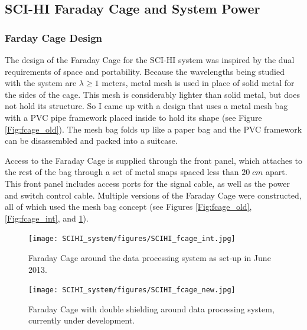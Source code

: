 \subsection{SCI-HI Faraday Cage and System Power}

\subsubsection{Farday Cage Design}

The design of the Faraday Cage for the SCI-HI system was inspired by the dual requirements of space and portability. Because the wavelengths being studied with the system are $\lambda \geq 1$ meters, metal mesh is used in place of solid metal for the sides of the cage. This mesh is considerably lighter than solid metal, but does not hold its structure. So I came up with a design that uses a metal mesh bag with a PVC pipe framework placed inside to hold its shape (see Figure \ref{Fig:fcage_old}). The mesh bag folds up like a paper bag and the PVC framework can be disassembled and packed into a suitcase. 

Access to the Faraday Cage is supplied through the front panel, which attaches to the rest of the bag through a set of metal snaps spaced less than $20 \; cm$ apart. This front panel includes access ports for the signal cable, as well as the power and switch control cable. Multiple versions of the Faraday Cage were constructed, all of which used the mesh bag concept (see Figures \ref{Fig:fcage_old}, \ref{Fig:fcage_int}, and \ref{Fig:fcage_new}). 

\begin{figure}[htb]
\centering
\begin{minipage}[b]{0.46\textwidth}
\centering
\texttt{[image: SCIHI\_system/figures/SCIHI\_fcage\_int.jpg]}
\caption{Faraday Cage around the data processing system as set-up in June 2013.}
\label{Fig:fcage_int}
\end{minipage}%
\begin{minipage}[b]{0.02\textwidth}
\hspace{1cm}
\end{minipage}%
\begin{minipage}[b]{0.52\textwidth}
\centering
\texttt{[image: SCIHI\_system/figures/SCIHI\_fcage\_new.jpg]}
\caption{Faraday Cage with double shielding around data processing system, currently under development.}
\label{Fig:fcage_new}
\end{minipage}
\end{figure}


